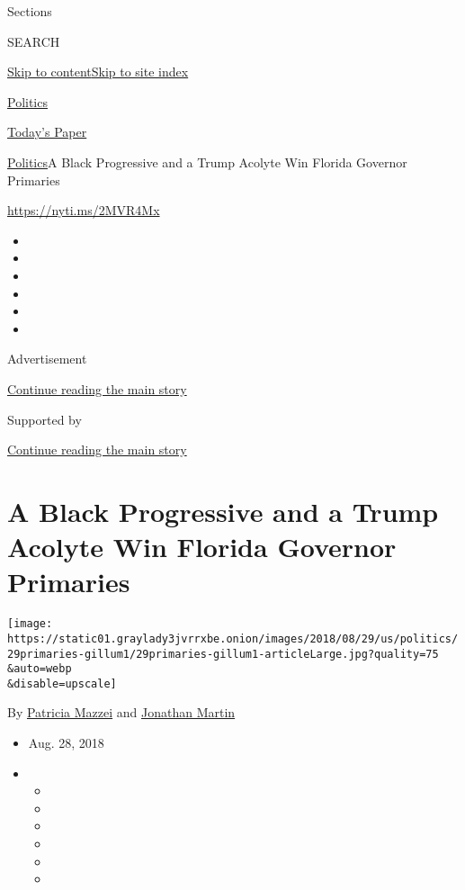 Sections

SEARCH

\protect\hyperlink{site-content}{Skip to
content}\protect\hyperlink{site-index}{Skip to site index}

\href{https://www.nytimes3xbfgragh.onion/section/politics}{Politics}

\href{https://myaccount.nytimes3xbfgragh.onion/auth/login?response_type=cookie\&client_id=vi}{}

\href{https://www.nytimes3xbfgragh.onion/section/todayspaper}{Today's
Paper}

\href{/section/politics}{Politics}\textbar{}A Black Progressive and a
Trump Acolyte Win Florida Governor Primaries

\url{https://nyti.ms/2MVR4Mx}

\begin{itemize}
\item
\item
\item
\item
\item
\item
\end{itemize}

Advertisement

\protect\hyperlink{after-top}{Continue reading the main story}

Supported by

\protect\hyperlink{after-sponsor}{Continue reading the main story}

\hypertarget{a-black-progressive-and-a-trump-acolyte-win-florida-governor-primaries}{%
\section{A Black Progressive and a Trump Acolyte Win Florida Governor
Primaries}\label{a-black-progressive-and-a-trump-acolyte-win-florida-governor-primaries}}

\texttt{[image: https://static01.graylady3jvrrxbe.onion/images/2018/08/29/us/politics/29primaries-gillum1/29primaries-gillum1-articleLarge.jpg?quality=75\\\&auto=webp\\\&disable=upscale]}

By \href{https://www.nytimes3xbfgragh.onion/by/patricia-mazzei}{Patricia
Mazzei} and
\href{https://www.nytimes3xbfgragh.onion/by/jonathan-martin}{Jonathan
Martin}

\begin{itemize}
\item
  Aug. 28, 2018
\item
  \begin{itemize}
  \item
  \item
  \item
  \item
  \item
  \item
  \end{itemize}
\end{itemize}

